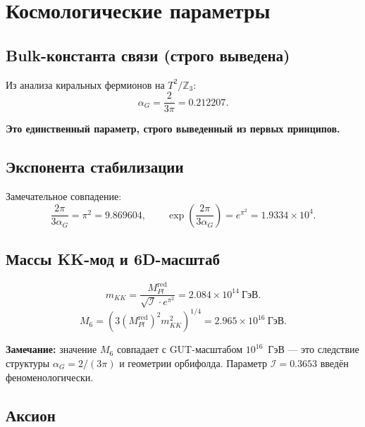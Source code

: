 \documentclass[12pt,a4paper]{article}
\numberwithin{equation}{section}
\begin{document}
\section{Космологические параметры}

\subsection{Bulk-константа связи (строго выведена)}

Из анализа киральных фермионов на $T^2/\mathbb{Z}_3$:
\begin{equation}
\alpha_G = \frac{2}{3\pi} = 0.212207.
\end{equation}

\textbf{Это единственный параметр, строго выведенный из первых 
принципов.}

\subsection{Экспонента стабилизации}

Замечательное совпадение:
\begin{equation}
\frac{2\pi}{3\alpha_G} = \pi^2 = 9.869604, \qquad 
\exp\left(\frac{2\pi}{3\alpha_G}\right) = e^{\pi^2} 
= 1.9334\times 10^4.
\end{equation}

\subsection{Массы KK-мод и 6D-масштаб}

\begin{equation}
m_{KK} = \frac{M_{Pl}^{\text{red}}}{\sqrt{\mathcal{I}} \cdot e^{\pi^2}} 
= 2.084\times 10^{14}~\text{ГэВ}.
\end{equation}
\begin{equation}
M_6 = \left(3 (M_{Pl}^{\text{red}})^2 m_{KK}^2\right)^{1/4} 
= 2.965\times 10^{16}~\text{ГэВ}.
\end{equation}

\textbf{Замечание:} значение $M_6$ совпадает с GUT-масштабом 
$10^{16}$~ГэВ --- это следствие структуры $\alpha_G = 2/(3\pi)$ 
и геометрии орбифолда. Параметр $\mathcal{I} = 0.3653$ введён 
феноменологически.

\subsection{Аксион}
\end{document}
